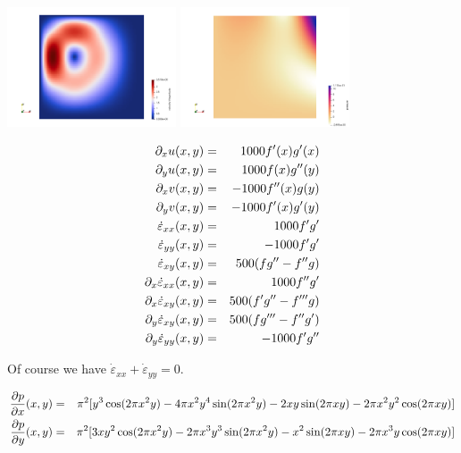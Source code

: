 \begin{center}
\includegraphics[width=5cm]{images/mms/mms_johnbook_vel}
\includegraphics[width=5cm]{images/mms/mms_johnbook_press}
\end{center}


\begin{eqnarray}
\partial_x u (x,y)&=& 1000f'(x)g'(x)\nonumber\\
\partial_y u (x,y)&=& 1000f(x)g''(y) \nonumber\\
\partial_x v (x,y)&=& -1000f''(x)g(y) \nonumber\\
\partial_y v (x,y)&=& -1000f'(x)g'(y)\nonumber\\
\dot\varepsilon_{xx}(x,y) &=& 1000f'g' \nonumber\\
\dot\varepsilon_{yy}(x,y) &=& -1000f'g' \nonumber\\
\dot\varepsilon_{xy}(x,y) &=&  500( fg'' - f''g )\nonumber\\
\partial_x \dot\varepsilon_{xx} (x,y)&=& 1000f''g'\nonumber\\
\partial_x \dot\varepsilon_{xy} (x,y)&=& 500( f'g'' - f'''g )\nonumber\\
\partial_y \dot\varepsilon_{xy} (x,y)&=& 500( fg''' - f''g' )\nonumber\\
\partial_y \dot\varepsilon_{yy} (x,y)&=&  -1000f'g''\nonumber
\end{eqnarray}

Of course we have $\dot\varepsilon_{xx}+\dot\varepsilon_{yy}=0$.

\begin{eqnarray}
\frac{\partial p}{\partial x} (x,y)
&=& \pi^2 [ y^3 \cos(2\pi x^2 y) -4\pi x^2y^4  \sin(2\pi x^2 y) -2xy \sin(2\pi x y) -2 \pi x^2 y^2 \cos(2\pi x y)  ]\nonumber\\
\frac{\partial p}{\partial y} (x,y)
&=& \pi^2 [3xy^2 \cos(2\pi x^2 y) -2\pi x^3y^3\sin(2\pi x^2 y)
-x^2 \sin(2\pi x y) -2\pi x^3 y \cos(2\pi x y) ]
\nonumber
\end{eqnarray}


